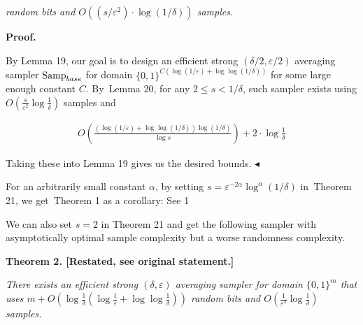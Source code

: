 \emph{random bits and $O((s/\varepsilon^{2})\cdot\log(1/\delta))$ samples.}\par







\par\medskip\noindent\textbf{Proof.}\par




By Lemma 19, our goal is to design an efficient strong $(\delta/2,\varepsilon/2)$ averaging sampler $\textup{{Samp}}_{base}$ for domain $\{0,1\}^{C(\log(1/\varepsilon)+\log\log(1/\delta))}$ for some large enough constant $C$. By Lemma 20, for any $2\leq s<1/\delta$, such sampler exists using $O(\frac{s}{\varepsilon^{2}}\log\frac{1}{\delta})$ samples and\par


\[\begin{gathered}
O\left(\frac{(\log(1/\varepsilon)+\log\log(1/\delta))\log(1/\delta)}{\log s}\right)+2\cdot{\log\frac{1}{\delta}}
\end{gathered}\]


Taking these into Lemma 19 gives us the desired bounds.
$\blacktriangleleft$\par




For an arbitrarily small constant $\alpha$, by setting $s=\varepsilon^{-2\alpha}\log^{\alpha}(1/\delta)$ in Theorem 21, we get Theorem 1 as a corollary:
See 1\par




We can also set $s=2$ in Theorem 21 and get the following sampler with asymptotically optimal sample complexity but a worse randomness complexity.\par






\par\medskip\noindent\textbf{
\textbf{Theorem 2}\textbf{.}
[Restated, see original statement.]}\par



\emph{There exists an efficient strong $(\delta,\varepsilon)$ averaging sampler for domain $\{0,1\}^{m}$ that uses $m+O(\log\frac{1}{\delta}(\log\frac{1}{\varepsilon}+\log\log\frac{1}{\delta}))$ random bits and $O(\frac{1}{\varepsilon^{2}}\log\frac{1}{\delta})$ samples.}\par




